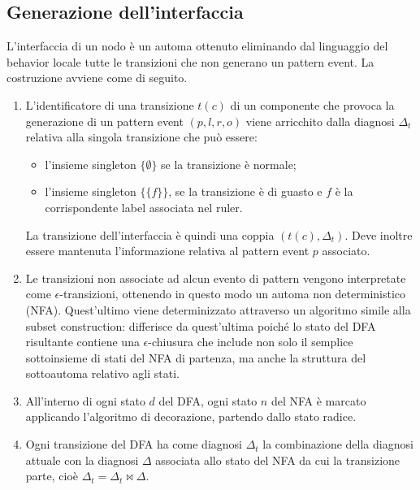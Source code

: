 \subsection{Generazione dell'interfaccia}
L'interfaccia di un nodo è un automa ottenuto eliminando dal linguaggio del behavior locale tutte le transizioni che non generano un pattern event.
La costruzione avviene come di seguito.
\begin{enumerate}
\item L'identificatore di una transizione $t(c)$ di un componente che provoca la generazione di un pattern event $(p,l,r,o)$ viene arricchito dalla diagnosi $\Delta_t$ relativa alla singola transizione che può essere:
\begin{itemize}
\item l'insieme singleton $\{\emptyset\}$ se la transizione è normale;
\item l'insieme singleton $\{\{f\}\}$, se la transizione è di guasto e $f$ è la corrispondente label associata nel ruler.
\end{itemize}
La transizione dell'interfaccia è quindi una coppia $(t(c),\Delta_t)$. Deve inoltre essere mantenuta l'informazione relativa al pattern event $p$ associato.
\item Le transizioni non associate ad alcun evento di pattern vengono interpretate come $\epsilon$-transizioni, ottenendo in questo modo un automa non deterministico (NFA). Quest'ultimo viene determinizzato attraverso un algoritmo simile alla subset construction: differisce da quest'ultima poiché lo stato del DFA risultante contiene una $\epsilon$-chiusura che include non solo il semplice sottoinsieme di stati del NFA di partenza, ma anche la struttura del sottoautoma relativo agli stati.
\item All'interno di ogni stato $d$ del DFA, ogni stato $n$ del NFA è marcato applicando l'algoritmo di decorazione, partendo dallo stato radice.
\item Ogni transizione del DFA ha come diagnosi $\Delta_t$ la combinazione della diagnosi attuale con la diagnosi $\Delta$ associata allo stato del NFA da cui la transizione parte, cioè $\Delta_t = \Delta_t \Join \Delta$.
\end{enumerate}

